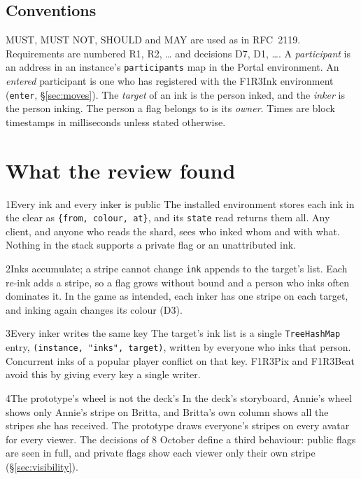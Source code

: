 \documentclass[11pt,a4paper]{article}
\newcommand{\code}[1]{\texttt{#1}}
\newcommand{\MUST}{{\fontsize{0.82em}{1em}\selectfont MUST}}
\newcommand{\MUSTNOT}{{\fontsize{0.82em}{1em}\selectfont MUST NOT}}
\newcommand{\SHOULD}{{\fontsize{0.82em}{1em}\selectfont SHOULD}}
\newcommand{\MAY}{{\fontsize{0.82em}{1em}\selectfont MAY}}
\begin{document}
\subsection{Conventions}

\MUST, \MUSTNOT, \SHOULD{} and \MAY{} are used as in RFC~2119. Requirements are numbered
R1, R2, \ldots{} and decisions D7, D1, \ldots. A \emph{participant} is an address in an
instance's \code{participants} map in the Portal environment. An \emph{entered} participant is
one who has registered with the F1R3Ink environment (\code{enter}, \S\ref{sec:moves}). The
\emph{target} of an ink is the person inked, and the \emph{inker} is the person inking. The
person a flag belongs to is its \emph{owner}. Times are block timestamps in milliseconds unless
stated otherwise.

\section{What the review found}\label{sec:findings}

\begin{finding}{1}{Every ink and every inker is public}
The installed environment stores each ink in the clear as \code{\{from, colour, at\}}, and its
\code{state} read returns them all. Any client, and anyone who reads the shard, sees who inked
whom and with what. Nothing in the stack supports a private flag or an unattributed ink.
\end{finding}

\begin{finding}{2}{Inks accumulate; a stripe cannot change}
\code{ink} appends to the target's list. Each re-ink adds a stripe, so a flag grows without
bound and a person who inks often dominates it. In the game as intended, each inker has one
stripe on each target, and inking again changes its colour (D3).
\end{finding}

\begin{finding}{3}{Every inker writes the same key}
The target's ink list is a single \code{TreeHashMap} entry, \code{(instance, "inks", target)},
written by everyone who inks that person. Concurrent inks of a popular player conflict on that
key. F1R3Pix and F1R3Beat avoid this by giving every key a single writer.
\end{finding}

\begin{finding}{4}{The prototype's wheel is not the deck's}
In the deck's storyboard, Annie's wheel shows only Annie's stripe on Britta, and Britta's own
column shows all the stripes she has received. The prototype draws everyone's stripes on every
avatar for every viewer. The decisions of 8 October define a third behaviour: public flags are
seen in full, and private flags show each viewer only their own stripe
(\S\ref{sec:visibility}).
\end{finding}
\end{document}
